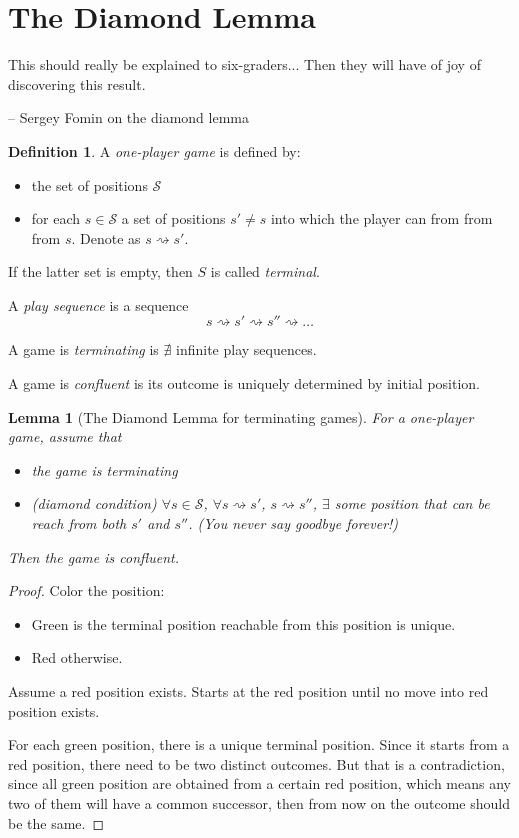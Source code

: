 \documentclass{report}
\newtheorem{lemma}{Lemma}[section]
\theoremstyle{definition}
\newtheorem{definition}{Definition}[section]
\theoremstyle{remark}
\numberwithin{equation}{section}
\begin{document}
\section{The Diamond Lemma}
\epigraph{This should really be explained to six-graders... Then they will have of joy of discovering this result.}{-- \textup{Sergey Fomin on the diamond lemma}}
\begin{definition}
    A \emph{one-player game} is defined by:
    \begin{itemize}
        \item the set of positions $\mathcal{S}$
        \item for each $s \in \mathcal{S}$ a set of positions $s' \neq s$ into which the player can from from from $s$. Denote as $s \rightsquigarrow s'$.
    \end{itemize}
    If the latter set is empty, then $S$ is called \emph{terminal}.

    A \emph{play sequence} is a sequence
    \[s \rightsquigarrow s' \rightsquigarrow s'' \rightsquigarrow \ldots\]

    A game is \emph{terminating} is $\nexists$ infinite play sequences.

    A game is \emph{confluent} is its outcome is uniquely determined by initial position.
\end{definition}

\begin{lemma}[The Diamond Lemma for terminating games]
    For a one-player game, assume that
    \begin{itemize}
        \item the game is terminating
        \item[$\diamond$](diamond condition) $\forall s \in \mathcal{S}$, $\forall s \rightsquigarrow s'$, $s \rightsquigarrow s''$, $\exists$ some position that can be reach from both $s'$ and $s''$. (You never say goodbye forever!)
    \end{itemize}
    Then the game is confluent.
\end{lemma}
\begin{proof}
    Color the position:
    \begin{itemize}
        \item[\textcolor{green}\textbullet] Green is the terminal position reachable from this position is unique.
        \item[\textcolor{red}\textbullet] Red otherwise.
    \end{itemize}
    Assume a red position exists. Starts at the red position until no move into red position exists. 

    For each green position, there is a unique terminal position. Since it starts from a red position, there need to be two distinct outcomes. But that is a contradiction, since all green position are obtained from a certain red position, which means any two of them will have a common successor, then from now on the outcome should be the same.
\end{proof}
\end{document}
